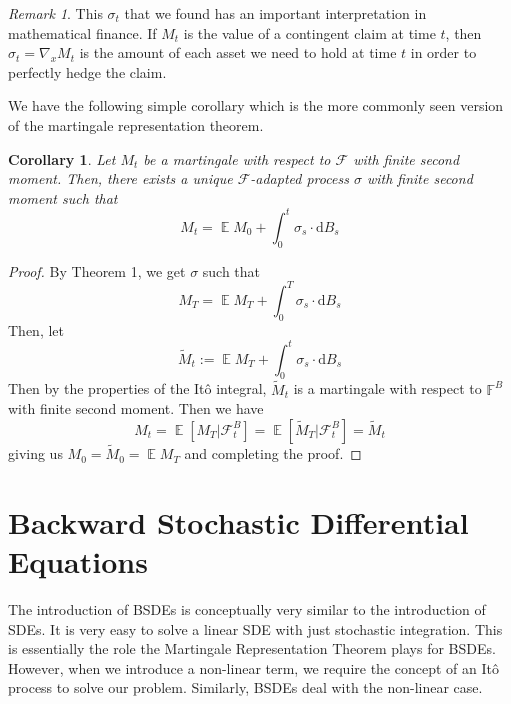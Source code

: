 \documentclass{amsart}
\newcommand{\ff}{\mathbb F}
\newcommand{\cF}{\mathcal{F}}
\DeclareMathOperator{\ee}{\mathbb E}
\newtheorem{corollary}[theorem]{Corollary}
\theoremstyle{definition}
\theoremstyle{remark}
\newtheorem{remark}[theorem]{Remark}
\numberwithin{equation}{section}
\begin{document}
\begin{remark}
    This $\sigma_t$ that we found has an important interpretation in mathematical finance. If $M_t$ is the value of a contingent claim at time $t$, then $\sigma_t = \nabla_x M_t$ is the amount of each asset we need to hold at time $t$ in order to perfectly hedge the claim.
\end{remark}
We have the following simple corollary which is the more commonly seen version of the martingale representation theorem.
\begin{corollary}
    Let $M_t$ be a martingale with respect to $\cF$ with finite second moment. Then, there exists a unique $\cF$-adapted process $\sigma$ with finite second moment such that
    \begin{equation}
        M_t = \ee M_0 + \int_0^t \sigma_s \cdot \mathrm{d}B_s
    \end{equation}
\end{corollary}
\begin{proof}
    By Theorem 1, we get $\sigma$ such that 
    \[
    M_T = \ee M_T + \int_0^T \sigma_s \cdot \mathrm{d}B_s
    \]
    Then, let 
    \[
    \tilde{M}_t := \ee M_T + \int_0^t \sigma_s \cdot \mathrm{d}B_s
    \]
    Then by the properties of the It\^o integral, $\tilde{M}_t$ is a martingale with respect to $\ff^B$ with finite second moment. 
    Then we have
    \[
    M_t = \ee[M_T | \cF_t^B] = \ee[\tilde{M}_T| \cF_t^B] = \tilde{M}_t
    \]
    giving us $M_0 = \tilde{M}_0 = \ee M_T$ and completing the proof.
\end{proof}

\section{Backward Stochastic Differential Equations}

The introduction of BSDEs is conceptually very similar to the introduction of SDEs. 
It is very easy to solve a linear SDE with just stochastic integration. 
This is essentially the role the Martingale Representation Theorem plays for BSDEs. 
However, when we introduce a non-linear term, we require the concept of an It\^o process to solve our problem. 
Similarly, BSDEs deal with the non-linear case. 
\end{document}
